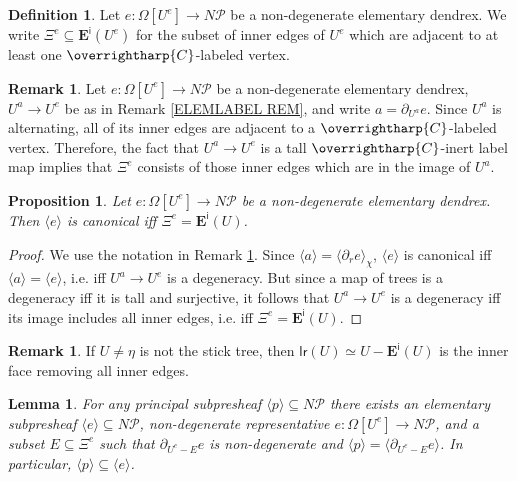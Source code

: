 \documentclass[a4paper,10pt]{article}%
\numberwithin{equation}{section}
\numberwithin{figure}{section}
\newtheorem{lemma}[equation]{Lemma}%
\newtheorem{proposition}[equation]{Proposition}%
\theoremstyle{definition} %
\newtheorem{definition}[equation]{Definition}%
\newtheorem{remark}[equation]{Remark}%
\newcommand{\vect}[1]{\text{\overrightharp{\ensuremath{#1}}}}
\newcommand{\1}{\ensuremath{\mathbbm 1}}%
\begin{document}
\begin{definition}\label{XIEDGES DEF}
	Let $e \colon \Omega[U^e] \to N \mathcal{P}$ be a non-degenerate elementary dendrex. 
	We write
	$\Xi^e \subseteq \boldsymbol{E}^{\mathsf{i}}(U^e)$
	for the subset of inner edges of $U^e$ which are adjacent to at least one $\vect{C}$-labeled vertex.
\end{definition}



\begin{remark}\label{XIEREDEF REM}
	Let $e \colon \Omega[U^e] \to N \mathcal{P}$ be a non-degenerate elementary dendrex, 
	$U^a \to U^e$ be as in Remark \ref{ELEMLABEL REM}, 
	and write $a = \partial_{U^a} e$.
	Since $U^a$ is alternating, all of its inner edges are adjacent to a 
	$\vect{C}$-labeled vertex. 
	Therefore, the fact that $U^a \to U^e$ is a tall $\vect{C}$-inert label map
	implies that $\Xi^e$ consists of those inner edges which are in the image of $U^a$.
\end{remark}



\begin{proposition}\label{CANIFFXIE PROP}
	Let $e \colon \Omega[U^e] \to N \mathcal{P}$ be a non-degenerate elementary dendrex.
	Then $\langle e \rangle$
	is canonical iff $\Xi^e = \boldsymbol{E}^{\mathsf{i}}(U)$.
\end{proposition}

\begin{proof}
	We use the notation in Remark \ref{XIEREDEF REM}.
	Since $\langle a\rangle = \langle \partial_r e \rangle_{\chi}$, 
	$\langle e \rangle$
	is canonical 
	iff
	$\langle a\rangle = \langle e \rangle$, i.e.
	iff
	$U^a \to U^e$ is a degeneracy. 
	But since a map of trees is a degeneracy iff it is tall and surjective,
	it follows that $U^a \to U^e$ is a degeneracy
	iff its image includes all inner edges, i.e. iff $\Xi^e = \boldsymbol{E}^{\mathsf{i}}(U)$.
\end{proof}



\begin{remark}\label{WHENLRINN REM}
	If $U\neq \eta$ is not the stick tree,
	then $\mathsf{lr}(U) \simeq U - \boldsymbol{E}^{\mathsf{i}}(U)$
	is the inner face removing all inner edges.
\end{remark}



\begin{lemma}\label{ELEMEXIST LEM}
	For any principal subpresheaf $\langle p \rangle \subseteq N \mathcal{P}$
	there exists an elementary subpresheaf
	$\langle e \rangle \subseteq N \mathcal P$, 
	non-degenerate representative 
	$e \colon \Omega[U^e] \to N \mathcal{P}$,
	and a subset $E \subseteq \Xi^{e}$
	such that
	$\partial_{U^e-E} e$ is non-degenerate and 
	$\langle p \rangle = \langle \partial_{U^e-E} e \rangle$.
	In particular,  
	$\langle p \rangle \subseteq \langle e \rangle$.
\end{lemma}
\end{document}
